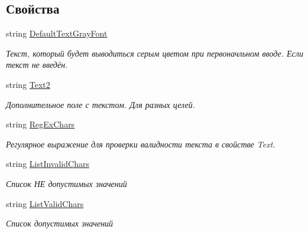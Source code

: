 \subsection*{Свойства}
\begin{DoxyCompactItemize}
\item 
string \mbox{\hyperlink{class_f_b_a_1_1_text_box_f_b_a_a162d907a4535c7647b40b7016d4b6b53}{Default\+Text\+Gray\+Font}}
\begin{DoxyCompactList}\small\item\em Текст, который будет выводиться серым цветом при первоначльном вводе. Если текст не введён. \end{DoxyCompactList}\item 
string \mbox{\hyperlink{class_f_b_a_1_1_text_box_f_b_a_aba134e720b2e148d3a52951c877d8637}{Text2}}
\begin{DoxyCompactList}\small\item\em Дополнительное поле с текстом. Для разных целей. \end{DoxyCompactList}\item 
string \mbox{\hyperlink{class_f_b_a_1_1_text_box_f_b_a_a7fc7992b99cd3b2543f3ff39668ea8c3}{Reg\+Ex\+Chars}}
\begin{DoxyCompactList}\small\item\em Регулярное выражение для проверки валидности текста в свойстве Text. \end{DoxyCompactList}\item 
string \mbox{\hyperlink{class_f_b_a_1_1_text_box_f_b_a_a8bf6d4061e258fab5f0f54ac603b87e6}{List\+Invalid\+Chars}}
\begin{DoxyCompactList}\small\item\em Список НЕ допустимых значений \end{DoxyCompactList}\item 
string \mbox{\hyperlink{class_f_b_a_1_1_text_box_f_b_a_a29388e3f720f0c1de61acb627e0f8b44}{List\+Valid\+Chars}}
\begin{DoxyCompactList}\small\item\em Список допустимых значений \end{DoxyCompactList}\item 

\end{DoxyCompactItemize}
